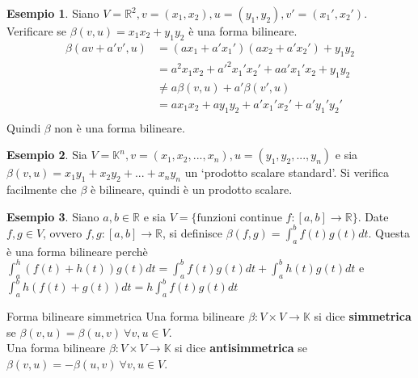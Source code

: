 \documentclass[a4paper]{article}
\theoremstyle{definition}
\newtheorem*{es}{Esempio}
\begin{document}
	\begin{es}
		Siano $V = \mathbb{R}^2, v = (x_1, x_2), u = (y_1, y_2), v' = (x_1', x_2')$. \\
		Verificare se $\beta(v, u) = x_1x_2 + y_1y_2$ è una forma bilineare.
		\begin{align*}
			\beta(av + a'v', u) &= (ax_1 + a'x_1')(ax_2 + a'x_2') + y_1y_2 \\
			&= a^2x_1x_2 + a'^2x_1'x_2' + aa'x_1'x_2 + y_1y_2 \\
			&\ne a\beta(v, u) + a'\beta(v', u) \\
			&= ax_1x_2 + ay_1y_2 + a'x_1'x_2' + a'y_1'y_2' \\
		\end{align*}
		Quindi $\beta$ non è una forma bilineare.
	\end{es}

	\begin{es}
		Sia $V = \mathbb{K}^n, v = (x_1, x_2, ..., x_n), u = (y_1, y_2, ..., y_n)$
		e sia $\beta(v, u) = x_1y_1 + x_2y_2 + ... + x_ny_n$ un \enquote*{prodotto scalare standard}.
		Si verifica facilmente che $\beta$ è bilineare, quindi è un prodotto scalare.
	\end{es}

	\begin{es}
		Siano $a, b \in \mathbb{R}$ e sia $V = \{ \text{funzioni continue } f: [a, b] \to \mathbb{R} \}$.
		Date $f, g \in V$, ovvero $f, g: [a, b] \to \mathbb{R}$, si definisce $\beta(f, g) = \int_a^b f(t)g(t)dt$.
		Questa è una forma bilineare perchè $\int_a^h (f(t) + h(t))g(t)dt = \int_a^b f(t)g(t)dt + \int_a^b h(t)g(t)dt$
		e $\int_a^b h(f(t) + g(t))dt = h\int_a^b f(t)g(t)dt$
	\end{es}

	\begin{deff}{Forma bilineare simmetrica}{}
		Una forma bilineare $\beta: V \times V \to \mathbb{K}$ si dice \textbf{simmetrica} se $\beta(v, u) = \beta(u, v) \ \forall v, u \in V$. \\
		Una forma bilineare $\beta: V \times V \to \mathbb{K}$ si dice \textbf{antisimmetrica} se $\beta(v, u) = -\beta(u, v) \ \forall v, u \in V$.
	\end{deff}
\end{document}
